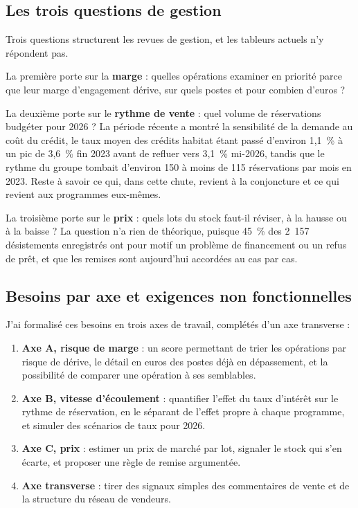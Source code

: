 \subsection{Les trois questions de gestion}

Trois questions structurent les revues de gestion, et les tableurs actuels n'y répondent pas.

La première porte sur la \textbf{marge} : quelles opérations examiner en priorité parce que leur
marge d'engagement dérive, sur quels postes et pour combien d'euros ?

La deuxième porte sur le \textbf{rythme de vente} : quel volume de réservations budgéter pour
2026 ? La période récente a montré la sensibilité de la demande au coût du crédit, le taux moyen
des crédits habitat étant passé d'environ 1,1~\% à un pic de 3,6~\% fin 2023 avant de refluer
vers 3,1~\% mi-2026, tandis que le rythme du groupe tombait d'environ 150 à moins de 115
réservations par mois en 2023. Reste à savoir ce qui, dans cette chute, revient à la conjoncture
et ce qui revient aux programmes eux-mêmes.

La troisième porte sur le \textbf{prix} : quels lots du stock faut-il réviser, à la hausse ou à
la baisse ? La question n'a rien de théorique, puisque 45~\% des 2~157 désistements enregistrés
ont pour motif un problème de financement ou un refus de prêt, et que les remises sont
aujourd'hui accordées au cas par cas.

\subsection{Besoins par axe et exigences non fonctionnelles}

J'ai formalisé ces besoins en trois axes de travail, complétés d'un axe transverse :

\begin{enumerate}
\def\labelenumi{\arabic{enumi}.}

\item
  \textbf{Axe A, risque de marge} : un score permettant de trier les opérations par risque de
  dérive, le détail en euros des postes déjà en dépassement, et la possibilité de comparer une
  opération à ses semblables.
\item
  \textbf{Axe B, vitesse d'écoulement} : quantifier l'effet du taux d'intérêt sur le rythme de
  réservation, en le séparant de l'effet propre à chaque programme, et simuler des scénarios de
  taux pour 2026.
\item
  \textbf{Axe C, prix} : estimer un prix de marché par lot, signaler le stock qui s'en écarte,
  et proposer une règle de remise argumentée.
\item
  \textbf{Axe transverse} : tirer des signaux simples des commentaires de vente et de la
  structure du réseau de vendeurs.
\end{enumerate}

